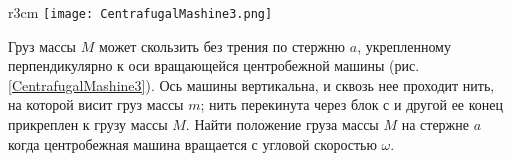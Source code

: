 \begin{wrapfigure}[9]{r}{3cm}
\texttt{[image: CentrafugalMashine3.png]}
\caption{}
\label{CentrafugalMashine3}
\end{wrapfigure}
\AddProb Груз массы $M$ может скользить без трения по стержню $a$,
укрепленному перпендикулярно к оси вращающейся центробежной машины (рис. \ref{CentrafugalMashine3}). Ось машины вертикальна, и сквозь нее проходит нить, на которой висит груз массы $m$; нить перекинута через блок с и другой ее конец прикреплен к грузу массы $M$. Найти положение груза массы $M$ на стержне $a$ когда центробежная машина вращается с угловой скоростью $\omega$.
\clearpage